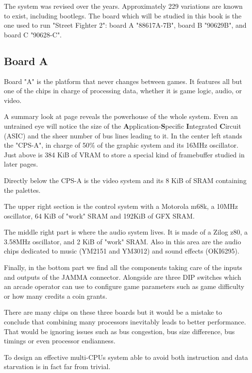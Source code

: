 The system was revised over the years. Approximately 229 variations are known to exist, including bootlegs\cite{mame_cps1_video}. The board which will be studied in this book is the one used to run "Street Fighter 2": board A "88617A-7B", board B "90629B", and board C "90628-C".

\subsection{Board A}
Board "A" is the platform that never changes between games. It features all but one of the chips in charge of processing data, whether it is game logic, audio, or video.

A summary look at page \pageref{fig:boarda} reveals the powerhouse of the whole system. Even an untrained eye will notice the size of the \textbf{A}pplication-\textbf{S}pecific \textbf{I}ntegrated \textbf{C}ircuit (ASIC) and the sheer number of bus lines leading to it. In the center left stands the "CPS-A", in charge of 50\% of the graphic system and its 16MHz oscillator. Just above is 384 KiB of VRAM to store a special kind of framebuffer studied in later pages.

Directly below the CPS-A is the video system and its 8 KiB of SRAM containing the palettes.

The upper right section is the control system with a Motorola m68k, a 10MHz oscillator, 64 KiB of "work" SRAM and 192KiB of GFX SRAM. 

The middle right part is where the audio system lives. It is made of a Zilog z80, a 3.58MHz oscillator, and 2 KiB of "work" SRAM. Also in this area are the audio chips dedicated to music (YM2151 and YM3012) and sound effects (OKI6295).

Finally, in the bottom part we find all the components taking care of the inputs and outputs of the JAMMA connector. Alongside are three DIP switches which an arcade operator can use to configure game parameters such as game difficulty or how many credits a coin grants.

There are many chips on these three boards but it would be a mistake to conclude that combining many processors inevitably leads to better performance. That would be ignoring issues such as bus congestion, bus size difference, bus timings or even processor endianness. 

To design an effective multi-CPUs system able to avoid both instruction and data starvation is in fact far from trivial.



